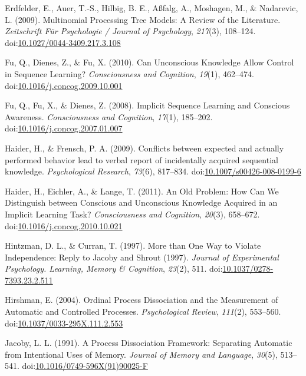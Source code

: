 \documentclass[floatsintext,man]{apa6}
\begin{document}
\hypertarget{ref-erdfelderux5fmultinomialux5f2009}{}
Erdfelder, E., Auer, T.-S., Hilbig, B. E., Aßfalg, A., Moshagen, M., \&
Nadarevic, L. (2009). Multinomial Processing Tree Models: A Review of
the Literature. \emph{Zeitschrift Für Psychologie / Journal of
Psychology}, \emph{217}(3), 108--124.
doi:\href{https://doi.org/10.1027/0044-3409.217.3.108}{10.1027/0044-3409.217.3.108}

\hypertarget{ref-fuux5fcanux5f2010}{}
Fu, Q., Dienes, Z., \& Fu, X. (2010). Can Unconscious Knowledge Allow
Control in Sequence Learning? \emph{Consciousness and Cognition},
\emph{19}(1), 462--474.
doi:\href{https://doi.org/10.1016/j.concog.2009.10.001}{10.1016/j.concog.2009.10.001}

\hypertarget{ref-fuux5fimplicitux5f2008}{}
Fu, Q., Fu, X., \& Dienes, Z. (2008). Implicit Sequence Learning and
Conscious Awareness. \emph{Consciousness and Cognition}, \emph{17}(1),
185--202.
doi:\href{https://doi.org/10.1016/j.concog.2007.01.007}{10.1016/j.concog.2007.01.007}

\hypertarget{ref-haiderux5fconflictsux5f2009}{}
Haider, H., \& Frensch, P. A. (2009). Conflicts between expected and
actually performed behavior lead to verbal report of incidentally
acquired sequential knowledge. \emph{Psychological Research},
\emph{73}(6), 817--834.
doi:\href{https://doi.org/10.1007/s00426-008-0199-6}{10.1007/s00426-008-0199-6}

\hypertarget{ref-haiderux5foldux5f2011}{}
Haider, H., Eichler, A., \& Lange, T. (2011). An Old Problem: How Can We
Distinguish between Conscious and Unconscious Knowledge Acquired in an
Implicit Learning Task? \emph{Consciousness and Cognition},
\emph{20}(3), 658--672.
doi:\href{https://doi.org/10.1016/j.concog.2010.10.021}{10.1016/j.concog.2010.10.021}

\hypertarget{ref-hintzmanux5fmoreux5f1997}{}
Hintzman, D. L., \& Curran, T. (1997). More than One Way to Violate
Independence: Reply to Jacoby and Shrout (1997). \emph{Journal of
Experimental Psychology. Learning, Memory \& Cognition}, \emph{23}(2),
511.
doi:\href{https://doi.org/10.1037/0278-7393.23.2.511}{10.1037/0278-7393.23.2.511}

\hypertarget{ref-hirshmanux5fordinalux5f2004}{}
Hirshman, E. (2004). Ordinal Process Dissociation and the Measurement of
Automatic and Controlled Processes. \emph{Psychological Review},
\emph{111}(2), 553--560.
doi:\href{https://doi.org/10.1037/0033-295X.111.2.553}{10.1037/0033-295X.111.2.553}

\hypertarget{ref-jacobyux5fprocessux5f1991}{}
Jacoby, L. L. (1991). A Process Dissociation Framework: Separating
Automatic from Intentional Uses of Memory. \emph{Journal of Memory and
Language}, \emph{30}(5), 513--541.
doi:\href{https://doi.org/10.1016/0749-596X(91)90025-F}{10.1016/0749-596X(91)90025-F}
\end{document}
